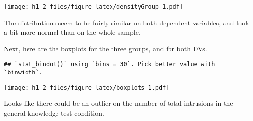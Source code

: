 \documentclass[12pt,]{article}
\newenvironment{Shaded}{\begin{snugshade}}{\end{snugshade}}
\newcommand{\DataTypeTok}[1]{\textcolor[rgb]{0.13,0.29,0.53}{#1}}
\newcommand{\DecValTok}[1]{\textcolor[rgb]{0.00,0.00,0.81}{#1}}
\newcommand{\FloatTok}[1]{\textcolor[rgb]{0.00,0.00,0.81}{#1}}
\newcommand{\KeywordTok}[1]{\textcolor[rgb]{0.13,0.29,0.53}{\textbf{#1}}}
\newcommand{\NormalTok}[1]{#1}
\newcommand{\OperatorTok}[1]{\textcolor[rgb]{0.81,0.36,0.00}{\textbf{#1}}}
\newcommand{\StringTok}[1]{\textcolor[rgb]{0.31,0.60,0.02}{#1}}
\begin{document}
\texttt{[image: h1-2\_files/figure-latex/densityGroup-1.pdf]}

The distributions seem to be fairly similar on both dependent variables,
and look a bit more normal than on the whole sample.

Next, here are the boxplots for the three groups, and for both DVs.

\begin{Shaded}
\end{Shaded}

\begin{verbatim}
## `stat_bindot()` using `bins = 30`. Pick better value with `binwidth`.
\end{verbatim}

\texttt{[image: h1-2\_files/figure-latex/boxplots-1.pdf]}

Looks like there could be an outlier on the number of total intrusions
in the general knowledge test condition.
\end{document}
